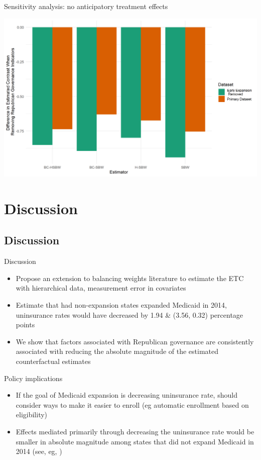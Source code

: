 \documentclass[hyperref={pdfpagelabels=false}]{beamer}
\begin{document}
\begin{frame}{Sensitivity analysis: no anticipatory treatment effects}
    \begin{center}
	\includegraphics[scale=0.5]{01_Plots/repub-diff-c1c2.png}
    \end{center}
\end{frame}

\section{Discussion}

\subsection{Discussion}

\begin{frame}{Discussion}
\begin{itemize}
    \item Propose an extension to balancing weights literature to estimate the ETC with hierarchical data, measurement error in covariates \bigskip
    \item Estimate that had non-expansion states expanded Medicaid in 2014, uninsurance rates would have decreased by 1.94 & (3.56, 0.32) percentage points \bigskip
    \item We show that factors associated with Republican governance are consistently associated with reducing the absolute magnitude of the estimated counterfactual estimates
\end{itemize}
\end{frame}

\begin{frame}{Policy implications}
    \begin{itemize}
        \item If the goal of Medicaid expansion is decreasing uninsurance rate, should consider ways to make it easier to enroll (eg automatic enrollment based on eligibility) \bigskip
        \item Effects mediated primarily through decreasing the uninsurance rate would be smaller in absolute magnitude among states that did not expand Medicaid in 2014 (see, eg, \cite{wherry2016early}) \bigskip
    \end{itemize}
\end{frame}
\end{document}
